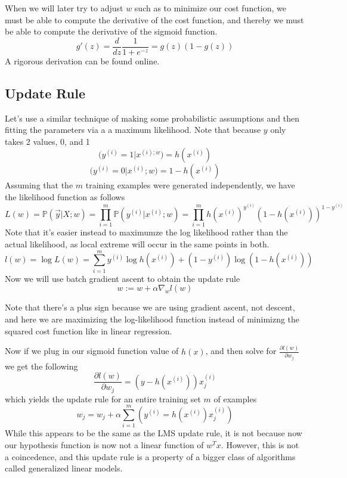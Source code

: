 \documentclass[12pt]{scrartcl}
\begin{document}
\begin{lemma}
    When we will later try to adjust $w$ such as to 
    minimize our cost function, we must be able to compute the 
    derivative of the cost function, and thereby we must be able 
    to compute the derivative of the sigmoid function.
    \[g'(z) = \frac{d}{dz}\frac{1}{1 + e^{-z}}
    = g(z)(1-g(z))\]
    A rigorous derivation can be found online.
\end{lemma}

\subsection{Update Rule}

Let's use a similar technique of making some 
probabilistic assumptions and then fitting the parameters via a
a maximum likelihood. Note that because $y$ only takes
2 values, 0, and 1
\[\mathbb(y^{(i)} = 1 | x^{(i); w}) = h(x^{(i)})\]
\[\mathbb(y^{(i)} = 0 | x^{(i)}; w) = 1 - h(x^{(i)})\]
Assuming that the $m$ training examples were 
generated independently, we have the likelihood function
as follows
\[L(w) = \mathbb{P}(\vec{y} | X; w) = \prod_{i=1}^m\mathbb{P}(y^{(i)} | x^{(i)}; w)
= \prod_{i=1}^m h(x^{(i)})^{y^{(i)}}(1-h(x^{(i)}))^{1-y^{(i)}}\]
Note that it's easier instead to maximumze the log likelihood 
rather than the actual likelihood, as local extreme will occur in the same 
points in both.
\[l(w) = \log L(w) = \sum_{i=1}^my^{(i)}\log h(x^{(i)}) + (1-y^{(i)})\log(1-h(x^{(i)}))\]
Now we will use batch gradient ascent to obtain the update rule
\[w:= w + \alpha \nabla_wl(w)\]
\begin{note}
    Note that there's a plus sign because we are using
    gradient ascent, not descent, and here we are maximizing the 
    log-likelihood function instead of minimizng the 
    squared cost function like in linear regression.
\end{note}
Now if we plug in our sigmoid function value of $h(x)$, and then solve for 
$\frac{\partial l(w)}{\partial w_j}$ we get the following 
\[\frac{\partial l(w)}{\partial w_j} = (y-h(x^{(i)}))x_j^{(i)}\]
which yields the update rule for an entire training set $m$ of examples
\[w_j = w_j + \alpha \sum_{i=1}^m (y^{(i)} = h(x^{(i)})x_j^{(i)})\]
While this appears to be the same as the LMS update rule, it is not because 
now our hypothesis function is now not a linear function of $w^Tx$. However, this is not a
coincedence, and this update rule is a  property of a bigger class of algorithms called
generalized linear models.
\end{document}
